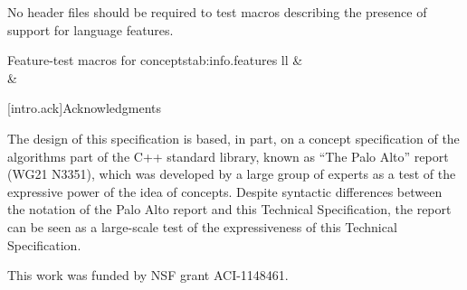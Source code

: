No header files should be required to test macros describing the presence
of support for language features.

\begin{floattable}{Feature-test macros for concepts}{tab:info.features}
{ll}
\topline
{} &  \\
\capsep
{}  &       \\
\end{floattable}

[intro.ack]{Acknowledgments}

\pnum
The design of this specification is based, in part, on a concept 
specification of the algorithms part of the C++ standard library, known 
as ``The Palo Alto'' report (WG21 N3351), which was developed by a large 
group of experts as a test of the expressive power of the idea of 
concepts. Despite syntactic differences between the notation of the 
Palo Alto report and this Technical Specification, the report can be seen as a 
large-scale test of the expressiveness of this Technical Specification.

\pnum
This work was funded by NSF grant ACI-1148461.
